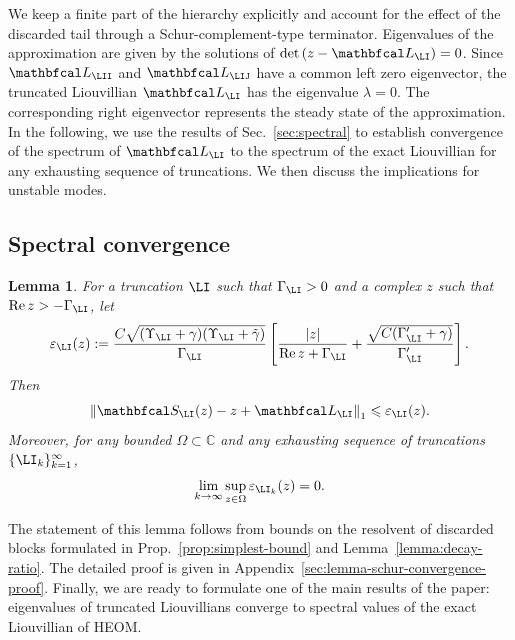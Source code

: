 \documentclass{SciPost}
\renewcommand{\Re}{\operatorname{Re}}
\newtheorem{lemma}{Lemma}
\begin{document}
We keep a finite part of the hierarchy explicitly and account for the effect of the discarded tail through a Schur-complement-type terminator.
Eigenvalues of the approximation are given by the solutions of $\det\left(z-\mathbfcal L_\LI\right)=0$. Since \(\mathbfcal L_\LII\) and \(\mathbfcal L_\LIJ\) have a common left zero eigenvector, the truncated Liouvillian \(\mathbfcal L_\LI\) has the eigenvalue \(\lambda = 0\). The corresponding right eigenvector represents the steady state of the approximation.
In the following, we use the results of Sec.~\ref{sec:spectral} to establish convergence of the spectrum of \(\mathbfcal L_\LI\) to the spectrum of the exact Liouvillian for any exhausting sequence of truncations. We then discuss the implications for unstable modes.

\subsection{Spectral convergence}

\begin{lemma}
    For a truncation $\LI$ such that $\Gamma_\LI > 0$ and a complex $z$ such that $\Re z>-\Gamma_\LI$, let
    \begin{equation}
        \varepsilon_\LI(z)
        :=
        \frac{
            C\sqrt{(\Upsilon_\LI+\gamma)(\Upsilon_\LI+\tilde\gamma)}
        }{\Gamma_\LI}
        \left[
            \frac{|z|}{\Re z+\Gamma_\LI}
            +
            \frac{\sqrt{C(\Gamma_\LI'+\gamma)}}{\Gamma_\LI'}
        \right].
        \label{eq:schur-error-majorant}
    \end{equation}
    Then
    \begin{equation}
        \left \| \mathbfcal S_\LI(z) - z + {\mathbfcal L}_\LI \right \|_1
        \leqslant
        \varepsilon_\LI(z).
        \label{eq:schur-error-bound}
    \end{equation}
    Moreover, for any bounded $\Omega \subset \mathbb C$ and any exhausting sequence of truncations $\{\LI_k\}_{k=1}^{\infty}$,
    \begin{equation}
        \lim_{k\to\infty}
        \sup_{z\in\Omega}
        \varepsilon_{\LI_k}(z)
        =0.
    \end{equation}
    \label{lemma:schur-convergence}
\end{lemma}
The statement of this lemma follows from bounds on the resolvent of discarded blocks formulated in Prop.~\ref{prop:simplest-bound} and Lemma~\ref{lemma:decay-ratio}. The detailed proof is given in Appendix~\ref{sec:lemma-schur-convergence-proof}. Finally, we are ready to formulate one of the main results of the paper: eigenvalues of truncated Liouvillians converge to spectral values of the exact Liouvillian of HEOM.
\end{document}
